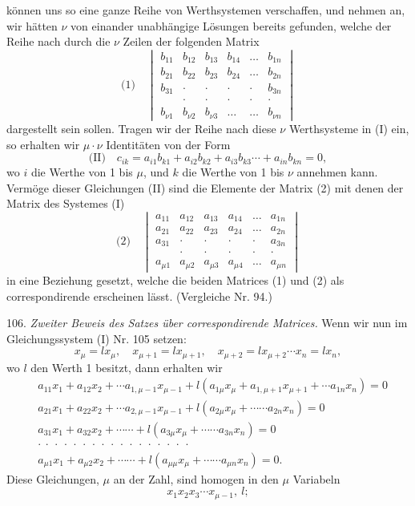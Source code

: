 \documentclass[11pt]{article}
\providecommand{\weberpage}[1]{}
\begin{document}
\weberpage{110}
können uns so eine ganze Reihe von Werthsystemen verschaffen, und nehmen an, wir hätten $\nu$ von einander unabhängige Lösungen bereits gefunden, welche der Reihe nach durch die $\nu$ Zeilen der folgenden Matrix
\[
\text{(1)}\quad
\begin{vmatrix}
b_{11} & b_{12} & b_{13} & b_{14} & \ldots & b_{1n} \\
b_{21} & b_{22} & b_{23} & b_{24} & \ldots & b_{2n} \\
b_{31} & \cdot & \cdot & \cdot & \cdot & b_{3n} \\
 & \cdot & \cdot & \cdot & \cdot & \cdot \\
b_{\nu1} & b_{\nu2} & b_{\nu3} & \ldots & \ldots & b_{\nu n}
\end{vmatrix}
\]
dargestellt sein sollen. Tragen wir der Reihe nach diese $\nu$ Werthsysteme in (I) ein, so erhalten wir $\mu\cdot\nu$ Identitäten von der Form
\[
\text{(II)}\quad c_{ik}=a_{i1}b_{k1}+a_{i2}b_{k2}+a_{i3}b_{k3}\cdots+a_{in}b_{kn}=0,
\]
wo $i$ die Werthe von 1 bis $\mu$, und $k$ die Werthe von 1 bis $\nu$ annehmen kann. Vermöge dieser Gleichungen (II) sind die Elemente der Matrix (2) mit denen der Matrix des Systemes (I)
\[
\text{(2)}\quad
\begin{vmatrix}
a_{11} & a_{12} & a_{13} & a_{14} & \ldots & a_{1n} \\
a_{21} & a_{22} & a_{23} & a_{24} & \ldots & a_{2n} \\
a_{31} & \cdot & \cdot & \cdot & \cdot & a_{3n} \\
 & \cdot & \cdot & \cdot & \cdot & \cdot \\
a_{\mu1} & a_{\mu2} & a_{\mu3} & a_{\mu4} & \ldots & a_{\mu n}
\end{vmatrix}
\]
in eine Beziehung gesetzt, welche die beiden Matrices (1) und (2) als correspondirende erscheinen lässt. (Vergleiche Nr. 94.)

106. \textit{Zweiter Beweis des Satzes über correspondirende Matrices.} Wenn wir nun im Gleichungssystem (I) Nr. 105 setzen:
\[ x_\mu = lx_\mu, \quad x_{\mu+1}=lx_{\mu+1}, \quad x_{\mu+2}=lx_{\mu+2}\cdots x_n=lx_n, \]
wo $l$ den Werth 1 besitzt, dann erhalten wir
\[
\begin{aligned}
&a_{11}x_1+a_{12}x_2+\cdots a_{1,\mu-1}x_{\mu-1}+l(a_{1\mu}x_\mu+a_{1,\mu+1}x_{\mu+1}+\cdots a_{1n}x_n)=0 \\
&a_{21}x_1+a_{22}x_2+\cdots a_{2,\mu-1}x_{\mu-1}+l(a_{2\mu}x_\mu+\cdots\cdots a_{2n}x_n)=0 \\
&a_{31}x_1+a_{32}x_2+\cdots\cdots+l(a_{3\mu}x_\mu+\cdots\cdots a_{3n}x_n)=0 \\
&\cdot\ \cdot\ \cdot\ \cdot\ \cdot\ \cdot\ \cdot\ \cdot\ \cdot\ \cdot\ \cdot\ \cdot\ \cdot\ \cdot\ \cdot\ \cdot\ \cdot \\
&a_{\mu1}x_1+a_{\mu2}x_2+\cdots\cdots+l(a_{\mu\mu}x_\mu+\cdots\cdots a_{\mu n}x_n)=0.
\end{aligned}
\]
Diese Gleichungen, $\mu$ an der Zahl, sind homogen in den $\mu$ Variabeln
\[ x_1x_2x_3\cdots x_{\mu-1},\ l; \]
\end{document}
